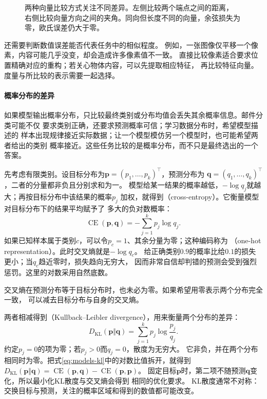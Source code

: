 \begin{figure}[htbp]
  \centering
  
  \caption{两种向量比较方式关注不同差异。左侧比较两个端点之间的距离，
  右侧比较向量方向之间的夹角。同向但长度不同的向量，余弦损失为零，欧氏误差仍大于零。}
  \label{fig:models-vector-comparison}
\end{figure}

还需要判断数值误差能否代表任务中的相似程度。
例如，一张图像仅平移一个像素，内容可能几乎没变，却会造成许多像素值不一致。
直接比较像素适合要求位置精确对应的重构；若关心物体内容，可以先提取相应特征，
再比较特征向量。度量与所比较的表示需要一起选择。

\paragraph{概率分布的差异}
\label{sec:models-probability-objectives}

如果模型输出概率分布，只比较最终类别或分布均值会丢失其余概率信息。邮件分类可能不仅
要求类别正确，还要求预测概率可信；学习数据分布时，希望模型描述的
样本出现规律接近实际数据；让一个模型模仿另一个模型时，也可能希望两者给出的类别
概率接近。这些任务比较的是概率分布，而不只是最终选出的一个答案。

先考虑有限类别。设目标分布为$\bm{p}=(p_1,\ldots,p_k)^{\top}$，预测分布为
$\bm{q}=(q_1,\ldots,q_k)^{\top}$，二者的分量都非负且分别求和为一。
模型给某一结果的概率越低，$-\log q_j$就越大；再按目标分布中该结果的概率$p_j$
加权，就得到（cross-entropy）。它衡量模型对目标分布下的结果平均赋予了
多大的负对数概率：
\begin{equation}
  \operatorname{CE}(\bm{p},\bm{q})=-\sum_{j=1}^{k}p_j\log q_j.
  \label{eq:models-cross-entropy}
\end{equation}
如果已知样本属于类别$c$，可以令$p_c=1$、其余分量为零；这种编码称为
（one-hot representation）。此时交叉熵就是$-\log q_c$。
给正确类别$0.9$的概率比给$0.1$的损失更小；当$q_c$趋近零时，损失趋向无穷大，
因而非常自信却判错的预测会受到强烈惩罚。这里的对数采用自然底数。

交叉熵在预测分布等于目标分布时，也未必为零。如果希望用零表示两个分布完全一致，
可以减去目标分布与自身的交叉熵。

两者相减得到（Kullback--Leibler divergence），用来衡量两个分布的差异：
\begin{equation}
  D_{\mathrm{KL}}(\bm{p}\Vert\bm{q})
  =\sum_{j=1}^{k}p_j\log\frac{p_j}{q_j}.
  \label{eq:models-kl}
\end{equation}
约定$p_j=0$的项为零；若$p_j>0$而$q_j=0$，散度为无穷大。
它非负，并在两个分布相同时为零。把式\eqref{eq:models-kl}中的对数比值拆开，就得到
$D_{\mathrm{KL}}(\bm{p}\Vert\bm{q})
=\operatorname{CE}(\bm{p},\bm{q})-\operatorname{CE}(\bm{p},\bm{p})$。
固定目标$\bm{p}$时，第二项不随预测$\bm{q}$变化，所以最小化KL散度与交叉熵会得到
相同的优化要求。
KL散度通常不对称：交换目标与预测，关注的概率区域和得到的数值都可能改变。

